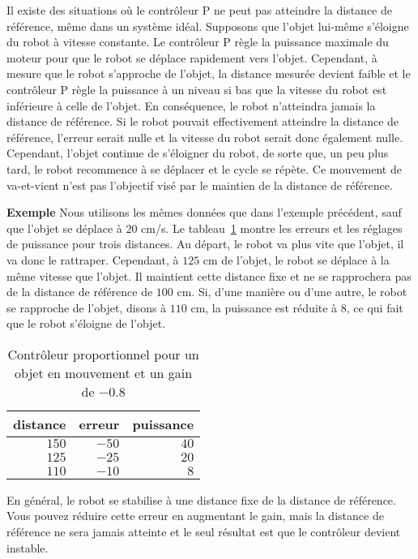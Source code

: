 Il existe des situations où le contrôleur P ne peut pas atteindre la distance de référence, même dans un système idéal. Supposons que l'objet lui-même s'éloigne du robot à vitesse constante. Le contrôleur P règle la puissance maximale du moteur pour que le robot se déplace rapidement vers l'objet. Cependant, à mesure que le robot s'approche de l'objet, la distance mesurée devient faible et le contrôleur P règle la puissance à un niveau si bas que la vitesse du robot est inférieure à celle de l'objet. En conséquence, le robot n'atteindra jamais la distance de référence. Si le robot pouvait effectivement atteindre la distance de référence, l'erreur serait nulle et la vitesse du robot serait donc également nulle. Cependant, l'objet continue de s'éloigner du robot, de sorte que, un peu plus tard, le robot recommence à se déplacer et le cycle se répète. Ce mouvement de va-et-vient n'est pas l'objectif visé par le maintien de la distance de référence.

\smallskip

\noindent\textbf{Exemple} Nous utilisons les mêmes données que dans l'exemple précédent, sauf que l'objet se déplace à $20$ cm/s. Le tableau~\ref{tab.p-controller-moving} montre les erreurs et les réglages de puissance pour trois distances. Au départ, le robot va plus vite que l'objet, il va donc le rattraper. Cependant, à $125$ cm de l'objet, le robot se déplace à la même vitesse que l'objet. Il maintient cette distance fixe et ne se rapprochera pas de la distance de référence de $100$ cm. Si, d'une manière ou d'une autre, le robot se rapproche de l'objet, disons à $110$ cm, la puissance est réduite à $8$, ce qui fait que le robot s'éloigne de l'objet.

\begin{table}
\caption{Contrôleur proportionnel pour un objet en mouvement et un gain de $-0.8$}
\label{tab.p-controller-moving}
\begin{tabular}{rrr}
\hline
\multicolumn{1}{c}{distance} & \multicolumn{1}{c}{erreur}& \multicolumn{1}{c}{puissance}\\
\hline
$150$ & $-50$ & $40$\\
$125$ & $-25$ & $20$\\
$110$ & $-10$ & $8$\\
\hline
\end{tabular}
\end{table}

En général, le robot se stabilise à une distance fixe de la distance de référence. Vous pouvez réduire cette erreur en augmentant le gain, mais la distance de référence ne sera jamais atteinte et le seul résultat est que le contrôleur devient instable.

